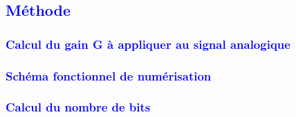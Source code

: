 \documentclass{article}
\numberwithin{equation}{section}
\begin{document}
\textcolor{blue}{\subsection{Méthode}}
\textcolor{blue}{\subsubsection{Calcul du gain G à appliquer au signal analogique }}

\textcolor{blue}{\subsubsection{Schéma fonctionnel de numérisation }}

\textcolor{blue}{\subsubsection{Calcul du nombre de bits }}
\end{document}
